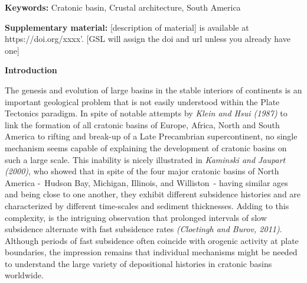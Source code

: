 \documentclass[manuscript,11pt]{geophysics}
\begin{document}
\noindent \textbf{Keywords:} Cratonic basin, Crustal architecture, South America
\linebreak 

\textbf{Supplementary material:} [description of material] is available at https://doi.org/xxxx’. [GSL will assign the doi and url unless you already have one]

\begin{flushleft}
\textbf{\LARGE Introduction}
\end{flushleft}

The genesis and evolution of large basins in the stable interiors of continents is an important geological problem that is not easily understood within the Plate Tectonics paradigm. In spite of notable attempts by \textit{Klein and Hsui (1987)} to link the formation of all cratonic basins of Europe, Africa, North and South America to rifting and break-up of a Late Precambrian supercontinent, no single mechanism seems capable of explaining the development of cratonic basins on such a large scale. This inability is nicely illustrated in \textit{Kaminski and Jaupart (2000)}, who showed that in spite of the four major cratonic basins of North America -~Hudson Bay, Michigan, Illinois, and Williston~- having similar ages and being close to one another, they exhibit different subsidence histories and are characterized by different time-scales and sediment thicknesses. Adding to this complexity, is the intriguing observation that prolonged intervals of slow subsidence alternate with fast subsidence rates \textit{(Cloetingh and Burov, 2011)}. Although periods of fast subsidence often coincide with orogenic activity at plate boundaries, the impression remains that individual mechanisms might be needed to understand the large variety of depositional histories in cratonic basins worldwide.
\end{document}
